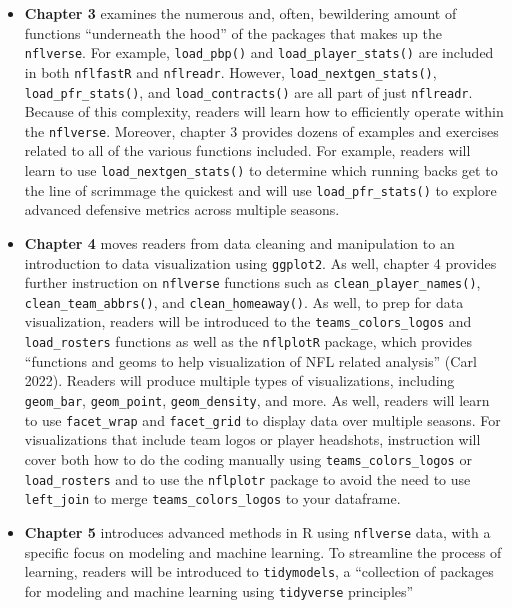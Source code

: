 \documentclass[
  letterpaper,
]{krantz}
\begin{document}
\begin{itemize}
\item
  \textbf{Chapter 3} examines the numerous and, often, bewildering
  amount of functions ``underneath the hood'' of the packages that makes
  up the \texttt{nflverse}. For example, \texttt{load\_pbp()} and
  \texttt{load\_player\_stats()} are included in both \texttt{nflfastR}
  and \texttt{nflreadr}. However, \texttt{load\_nextgen\_stats()},
  \texttt{load\_pfr\_stats()}, and \texttt{load\_contracts()} are all
  part of just \texttt{nflreadr}. Because of this complexity, readers
  will learn how to efficiently operate within the \texttt{nflverse}.
  Moreover, chapter 3 provides dozens of examples and exercises related
  to all of the various functions included. For example, readers will
  learn to use \texttt{load\_nextgen\_stats()} to determine which
  running backs get to the line of scrimmage the quickest and will use
  \texttt{load\_pfr\_stats()} to explore advanced defensive metrics
  across multiple seasons.
\item
  \textbf{Chapter 4} moves readers from data cleaning and manipulation
  to an introduction to data visualization using \texttt{ggplot2}. As
  well, chapter 4 provides further instruction on \texttt{nflverse}
  functions such as \texttt{clean\_player\_names()},
  \texttt{clean\_team\_abbrs()}, and \texttt{clean\_homeaway()}. As
  well, to prep for data visualization, readers will be introduced to
  the \texttt{teams\_colors\_logos} and \texttt{load\_rosters} functions
  as well as the \texttt{nflplotR} package, which provides ``functions
  and geoms to help visualization of NFL related analysis'' (Carl 2022).
  Readers will produce multiple types of visualizations, including
  \texttt{geom\_bar}, \texttt{geom\_point}, \texttt{geom\_density}, and
  more. As well, readers will learn to use \texttt{facet\_wrap} and
  \texttt{facet\_grid} to display data over multiple seasons. For
  visualizations that include team logos or player headshots,
  instruction will cover both how to do the coding manually using
  \texttt{teams\_colors\_logos} or \texttt{load\_rosters} and to use the
  \texttt{nflplotr} package to avoid the need to use \texttt{left\_join}
  to merge \texttt{teams\_colors\_logos} to your dataframe.
\item
  \textbf{Chapter 5} introduces advanced methods in R using
  \texttt{nflverse} data, with a specific focus on modeling and machine
  learning. To streamline the process of learning, readers will be
  introduced to \texttt{tidymodels}, a ``collection of packages for
  modeling and machine learning using \texttt{tidyverse} principles''

\end{itemize}
\end{document}
